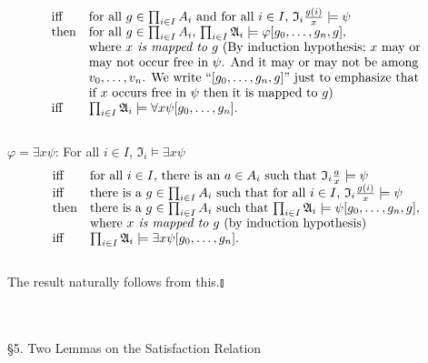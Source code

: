 \begin{enumerate}[1.]
\[\begin{array}{ll}
\mbox{iff} & \mbox{for all $g \in \prod_{i \in I} A_i$ and for all $i \in I$, $\mathfrak{I}_i \frac{g(i)}{x} \models \psi$} \\
\mbox{then} & \mbox{for all $g \in \prod_{i \in I} A_i$, $\prod_{i \in I} \mathfrak{A}_i \models \varphi [g_0, \ldots , g_n, g]$}, \\
\,  & \mbox{where \textit{$x$ is mapped to $g$} (By induction hypothesis; $x$ may or} \\
\,  & \mbox{may not occur free in $\psi$. And it may or may not be among} \\
\,  & \mbox{$v_0, \ldots , v_n$. We write ``$[g_0, \ldots , g_n, g]$'' just to emphasize that} \\
\,  & \mbox{if $x$ occurs free in $\psi$ then it is mapped to $g$)} \\
\mbox{iff} & \prod_{i \in I} \mathfrak{A}_i \models \forall x \psi [g_0, \ldots , g_n].
\end{array}
\]
\ 
\\$\varphi = \exists x \psi$: For all $i \in I$, $\mathfrak{I}_i \models \exists x \psi$
\[
\begin{array}{ll}
\mbox{iff} & \mbox{for all $i \in I$, there is an $a \in A_i$ such that $\mathfrak{I}_i \frac{a}{x} \models \psi$} \\
\mbox{iff} & \mbox{there is a $g \in \prod_{i \in I} A_i$ such that for all $i \in I$, $\mathfrak{I}_i \frac{g(i)}{x} \models \psi$} \\
\mbox{then} & \mbox{there is a $g \in \prod_{i \in I} A_i$ such that $\prod_{i \in I} \mathfrak{A}_i \models \psi [g_0, \ldots , g_n, g]$,} \\
\,  & \mbox{where \textit{$x$ is mapped to $g$} (by induction hypothesis)}\\
\mbox{iff} & \prod_{i \in I} \mathfrak{A}_i \models \exists x \psi [g_0, \ldots , g_n].
\end{array}
\]
\ 
\\The result naturally follows from this.\nolinebreak\hfill$\talloblong$
\end{enumerate}
\ 
\\
\\
{\large \S5. Two Lemmas on the Satisfaction Relation}
